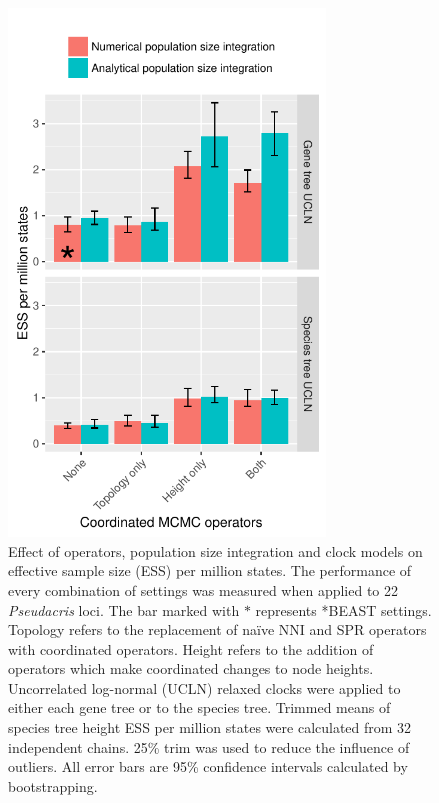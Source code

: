 \documentclass[12pt]{article}
\begin{document}
\begin{figure}[htb!]
\centering
\includegraphics[height=14cm]{speciesTreeHeight_ess_per_mstates.pdf}
\caption
{Effect of operators, population size integration and clock models on effective
sample size (ESS) per million states. The performance of every combination of
settings was measured when applied to 22 \textit{Pseudacris} loci. The bar marked with $\ast$ represents *BEAST
settings. Topology refers to the
replacement of na\"ive NNI and SPR operators with coordinated operators. Height
refers to the addition of operators which make coordinated changes to
node heights. Uncorrelated log-normal (UCLN) relaxed clocks were applied
to either each gene tree or to the species tree. Trimmed means
of species tree height ESS per million states were calculated from 32
independent chains. 25\% trim was used to reduce the influence
of outliers. All error bars are 95\% confidence intervals calculated by
bootstrapping.}
\label{fig:realEssPerMstates}
\end{figure}
\end{document}
